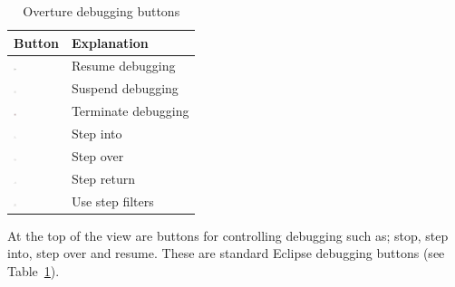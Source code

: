 {\begin{table}
\begin{center}
\caption{Overture debugging buttons\label{tab:debugButtons}}
\begin{tabular}{|l|l|}\hline \hline
\textbf{Button} & \textbf{Explanation} \\ \hline
\includegraphics[width=0.06\textwidth]{figures/resume} & Resume debugging \\
\includegraphics[width=0.06\textwidth]{figures/suspend} & Suspend debugging\\
\includegraphics[width=0.06\textwidth]{figures/terminate} & Terminate debugging\\
\includegraphics[width=0.06\textwidth]{figures/stepinto} & Step into\\
\includegraphics[width=0.06\textwidth]{figures/stepover} & Step over \\
\includegraphics[width=0.06\textwidth]{figures/stepreturn} & Step return\\
\includegraphics[width=0.06\textwidth]{figures/stepbystep} & Use step filters\\
\hline \hline
\end{tabular}
\end{center}
\end{table}

At the top of the view are buttons for controlling debugging such as;
stop, step into, step over and resume. These are standard Eclipse
debugging buttons (see Table~\ref{tab:debugButtons}).

}
